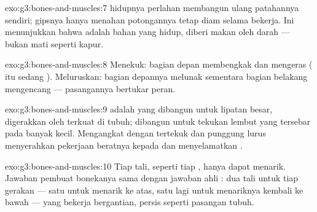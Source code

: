 \begin{solution}{exo:g3:bones-and-muscles:7}
 hidupnya perlahan membangun ulang patahannya sendiri; gipsnya
hanya menahan potongannya tetap diam selama  bekerja. Ini
menunjukkan bahwa  adalah bahan yang hidup, diberi makan oleh
darah --- bukan mati seperti kapur.
\end{solution}

\begin{solution}{exo:g3:bones-and-muscles:8}
Menekuk: bagian depan  membengkak dan mengeras ( itu sedang
). Meluruskan: bagian depannya melunak sementara bagian
belakang  mengencang --- pasangannya bertukar peran.
\end{solution}

\begin{solution}{exo:g3:bones-and-muscles:9}
 adalah  yang dibangun untuk lipatan besar, digerakkan oleh
 terkuat di tubuh;  dibangun untuk tekukan lembut
yang tersebar pada banyak  kecil. Mengangkat dengan 
tertekuk dan punggung lurus menyerahkan pekerjaan beratnya kepada
 dan menyelamatkan .
\end{solution}

\begin{solution}{exo:g3:bones-and-muscles:10}
Tiap tali, seperti tiap , hanya dapat menarik. Jawaban pembuat
bonekanya sama dengan jawaban ahli : dua tali untuk tiap
gerakan --- satu untuk menarik  ke atas, satu lagi untuk
menariknya kembali ke bawah --- yang bekerja bergantian, persis
seperti pasangan  tubuh.
\end{solution}
